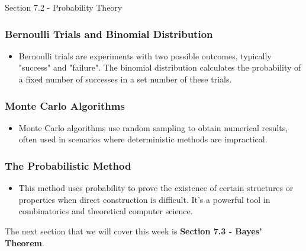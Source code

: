 \begin{notes}{Section 7.2 - Probability Theory}
    \subsubsection*{Bernoulli Trials and Binomial Distribution}
    \begin{itemize}
        \item Bernoulli trials are experiments with two possible outcomes, typically "success" and "failure". The binomial distribution calculates the probability of a fixed number of successes in 
        a set number of these trials.
    \end{itemize}

    \subsubsection*{Monte Carlo Algorithms}
    \begin{itemize}
        \item Monte Carlo algorithms use random sampling to obtain numerical results, often used in scenarios where deterministic methods are impractical.
    \end{itemize}

    \subsubsection*{The Probabilistic Method}
    \begin{itemize}
        \item This method uses probability to prove the existence of certain structures or properties when direct construction is difficult. It's a powerful tool in combinatorics and theoretical 
        computer science.
    \end{itemize}
\end{notes}

The next section that we will cover this week is \textbf{Section 7.3 - Bayes' Theorem}.

